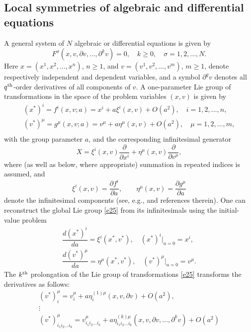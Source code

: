 \documentclass[11pt,letter,subeqn]{article}
\def\barr{\begin{array}{ll}}
\def\earr{\end{array}}
\begin{document}
\subsection{Local symmetries of algebraic and differential equations}

A general system of $N$ algebraic or differential equations is given by
\begin{equation}\label{gs1}
   F^{\sigma}(x,v,\partial v,\ldots, \partial^k v)=0,\quad k\geq 0, \quad \sigma=1,2,...,N.
\end{equation}
Here $x = (x^1 ,x^2 ,...,x^n )$, $n\geq 1$, and $v=(v^1, v^2, ..., v^m)$, $m\geq 1$, denote respectively independent and dependent variables, and a symbol $\partial^q v$ denotes all $q^{\rm th}$-order derivatives of all components of $v$.
A one-parameter Lie group of transformations in the space of the problem variables $(x,v)$ is given by
\begin{equation}\label{e25}
\begin{array}{l}
  (x^*)^i  = f^i (x,v;a) =x^i+a\xi^i(x,v)+ O(a^2) ,\quad i = 1,2, \ldots ,n, \\
  (v^*)^\mu  = g^\mu (x,v;a)= v^\mu +a \eta^\mu(x,v)+ O(a^2),\quad \mu = 1,2, \ldots ,m, \\
 \end{array}
\end{equation}
with the group parameter $a$, and the corresponding infinitesimal generator
\begin{equation}\label{e100}
X = \xi^i (x,v)\dfrac{\partial }{{\partial x^i }}
+ \eta ^\mu (x,v) \dfrac{\partial }{{\partial v^\mu }},
\end{equation}
where (as well as below, where appropriate) summation in repeated indices is assumed, and
\[
\xi^i(x,v) = \dfrac{\partial f^i}{\partial a},\qquad \eta^\mu (x,v) = \dfrac{\partial g^\mu }{\partial a}
\]
denote the infinitesimal components (see, e.g., \cite{olver2000applications, bluman2010applications} and references therein).
One can reconstruct the global Lie group \eqref{e25} from its infinitesimals using the initial-value problem
\begin{equation}\label{Lie1}
\barr
  \dfrac{d (x^*)^i}{d a} = \xi^i(x^*,v^*),\quad (x^*)^i\big|_{a=0}=x^i, \\[1.5ex]
  \dfrac{d (v^*)^\mu}{d a} = \eta^\mu(x^*,v^*),\quad (v^*)^\mu\big|_{a=0}=v^\mu.
\earr
\end{equation}
The $k^{\rm th}$  prolongation of the Lie group of transformations \eqref{e25} transforms the derivatives as follows:
\begin{equation}\label{e26}
\begin{array}{l}
  (v^*)^\mu_i  = v_i^\mu  + a \eta _i^{(1)\mu}(x,v,\partial v) + O(a^2), \\
  \vdots  \\
 (v^*)_{i_1 i_2  \ldots i_k }^\mu  = v_{i_1 i_2  \ldots i_k }^\mu  + a \eta _{i_1 i_2  \ldots i_k }^{(k)\mu}(x,v,\partial v,\ldots, \partial^k v) + O(a^2) \\
 \end{array}
\end{equation}
\end{document}
